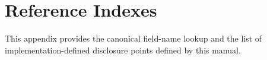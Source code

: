 \clearpage
\appendix
\section{Reference Indexes}\label{page:reference-indexes}\label{section:reference-indexes}

This appendix provides the canonical field-name lookup and the list of
implementation-defined disclosure points defined by this manual.
